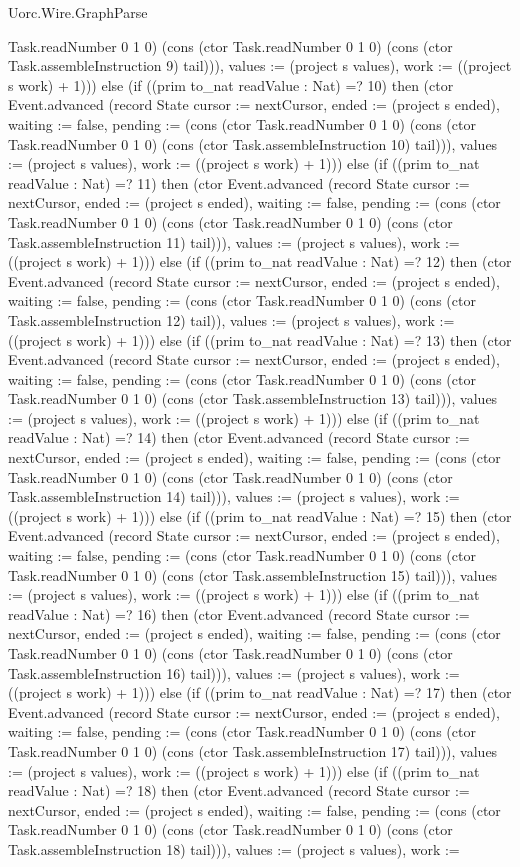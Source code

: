 \begin{lexlean}{Uorc.Wire.GraphParse}
\begin{semanticmodule}
{Task.readNumber 0 1 0) (cons (ctor Task.readNumber 0 1 0) (cons (ctor Task.assembleInstruction 9) tail))), values := (project s values), work := ((project s work) + 1)})) else (if ((prim to_nat readValue : Nat) =? 10) then (ctor Event.advanced (record State {cursor := nextCursor, ended := (project s ended), waiting := false, pending := (cons (ctor Task.readNumber 0 1 0) (cons (ctor Task.readNumber 0 1 0) (cons (ctor Task.assembleInstruction 10) tail))), values := (project s values), work := ((project s work) + 1)})) else (if ((prim to_nat readValue : Nat) =? 11) then (ctor Event.advanced (record State {cursor := nextCursor, ended := (project s ended), waiting := false, pending := (cons (ctor Task.readNumber 0 1 0) (cons (ctor Task.readNumber 0 1 0) (cons (ctor Task.assembleInstruction 11) tail))), values := (project s values), work := ((project s work) + 1)})) else (if ((prim to_nat readValue : Nat) =? 12) then (ctor Event.advanced (record State {cursor := nextCursor, ended := (project s ended), waiting := false, pending := (cons (ctor Task.readNumber 0 1 0) (cons (ctor Task.assembleInstruction 12) tail)), values := (project s values), work := ((project s work) + 1)})) else (if ((prim to_nat readValue : Nat) =? 13) then (ctor Event.advanced (record State {cursor := nextCursor, ended := (project s ended), waiting := false, pending := (cons (ctor Task.readNumber 0 1 0) (cons (ctor Task.readNumber 0 1 0) (cons (ctor Task.assembleInstruction 13) tail))), values := (project s values), work := ((project s work) + 1)})) else (if ((prim to_nat readValue : Nat) =? 14) then (ctor Event.advanced (record State {cursor := nextCursor, ended := (project s ended), waiting := false, pending := (cons (ctor Task.readNumber 0 1 0) (cons (ctor Task.readNumber 0 1 0) (cons (ctor Task.assembleInstruction 14) tail))), values := (project s values), work := ((project s work) + 1)})) else (if ((prim to_nat readValue : Nat) =? 15) then (ctor Event.advanced (record State {cursor := nextCursor, ended := (project s ended), waiting := false, pending := (cons (ctor Task.readNumber 0 1 0) (cons (ctor Task.readNumber 0 1 0) (cons (ctor Task.assembleInstruction 15) tail))), values := (project s values), work := ((project s work) + 1)})) else (if ((prim to_nat readValue : Nat) =? 16) then (ctor Event.advanced (record State {cursor := nextCursor, ended := (project s ended), waiting := false, pending := (cons (ctor Task.readNumber 0 1 0) (cons (ctor Task.readNumber 0 1 0) (cons (ctor Task.assembleInstruction 16) tail))), values := (project s values), work := ((project s work) + 1)})) else (if ((prim to_nat readValue : Nat) =? 17) then (ctor Event.advanced (record State {cursor := nextCursor, ended := (project s ended), waiting := false, pending := (cons (ctor Task.readNumber 0 1 0) (cons (ctor Task.readNumber 0 1 0) (cons (ctor Task.assembleInstruction 17) tail))), values := (project s values), work := ((project s work) + 1)})) else (if ((prim to_nat readValue : Nat) =? 18) then (ctor Event.advanced (record State {cursor := nextCursor, ended := (project s ended), waiting := false, pending := (cons (ctor Task.readNumber 0 1 0) (cons (ctor Task.readNumber 0 1 0) (cons (ctor Task.assembleInstruction 18) tail))), values := (project s values), work := }
\end{semanticmodule}
\end{lexlean}
